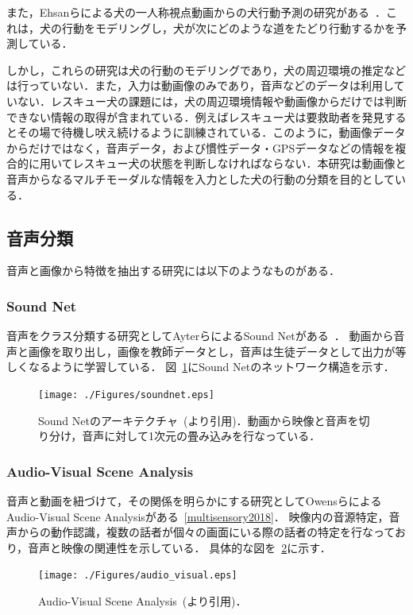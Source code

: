 また，Ehsanらによる犬の一人称視点動画からの犬行動予測の研究がある~\cite{whoretthedog}．これは，犬の行動をモデリングし，犬が次にどのような道をたどり行動するかを予測している．

しかし，これらの研究は犬の行動のモデリングであり，犬の周辺環境の推定などは行っていない．また，入力は動画像のみであり，音声などのデータは利用していない．レスキュー犬の課題には，犬の周辺環境情報や動画像からだけでは判断できない情報の取得が含まれている．例えばレスキュー犬は要救助者を発見するとその場で待機し吠え続けるように訓練されている．このように，動画像データからだけではなく，音声データ，および慣性データ・GPSデータなどの情報を複合的に用いてレスキュー犬の状態を判断しなければならない．本研究は動画像と音声からなるマルチモーダルな情報を入力とした犬の行動の分類を目的としている． 


\subsection{音声分類}
音声と画像から特徴を抽出する研究には以下のようなものがある．
\subsubsection{Sound Net}
音声をクラス分類する研究としてAyterらによるSound Netがある~\cite{aytar2016soundnet}．
動画から音声と画像を取り出し，画像を教師データとし，音声は生徒データとして出力が等しくなるように学習している．
図~\ref{soundnet_network}にSound Netのネットワーク構造を示す．
\begin{figure}[htbp]
 \begin{center}
  \texttt{[image: ./Figures/soundnet.eps]}
  \caption{Sound Netのアーキテクチャ~(\cite{aytar2016soundnet}より引用)．動画から映像と音声を切り分け，音声に対して1次元の畳み込みを行なっている．}
  \label{soundnet_network}
 \end{center}
\end{figure}

\subsubsection{Audio-Visual Scene Analysis}
音声と動画を紐づけて，その関係を明らかにする研究としてOwensらによるAudio-Visual Scene Analysisがある~\ref{multisensory2018}．
映像内の音源特定，音声からの動作認識，複数の話者が個々の画面にいる際の話者の特定を行なっており，音声と映像の関連性を示している．
具体的な図を~\ref{audio_visual}に示す．
\begin{figure}[htbp]
 \begin{center}
  \texttt{[image: ./Figures/audio\_visual.eps]}
  \caption{Audio-Visual Scene Analysis~(\cite{multisensory2018}より引用)．}
  \label{audio_visual}
 \end{center}
\end{figure}
